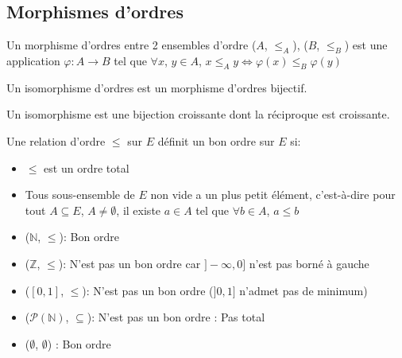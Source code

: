 \subsection{Morphismes d'ordres}

\begin{definition}

	Un morphisme d'ordres entre 2 ensembles d'ordre ($A$, $\leqslant_A$), ($B$, $\leqslant_B$) est une application $\varphi : A \to B$
	tel que $\forall x$, $y\in A$, $x \leqslant_A y \iff \varphi(x) \leqslant_B \varphi(y)$

\end{definition}

\begin{definition}
	Un isomorphisme d'ordres est un morphisme d'ordres bijectif.
\end{definition}

\begin{remarque}
	Un isomorphisme est une bijection croissante dont la réciproque est croissante.
\end{remarque}

\begin{definition}
	Une relation d'ordre $\leqslant$ sur $E$ définit un bon ordre sur $E$ si:
	\begin{itemize}
		\item $\leqslant$ est un ordre total
		\item Tous sous-ensemble de $E$ non vide a un plus petit élément, c'est-à-dire pour tout $A \subseteq E$, $A \neq \emptyset$, il existe
		      $a \in A$ tel que $\forall b \in A$, $a \leqslant b$
	\end{itemize}
\end{definition}

\begin{example}
	\begin{itemize}
		\item ($\mathbb{N}$, $\leqslant$): Bon ordre
		\item ($\mathbb{Z}$, $\leqslant$): N'est pas un bon ordre car $]-\infty, 0]$ n'est pas borné à gauche
		\item ($[0, 1]$, $\leqslant$): N'est pas un bon ordre ($]0, 1]$ n'admet pas de minimum)
		\item ($\mathscr{P}(\mathbb{N})$, $\subseteq$): N'est pas un bon ordre : Pas total
		\item ($\emptyset$, $\emptyset$) : Bon ordre
	\end{itemize}
\end{example}

